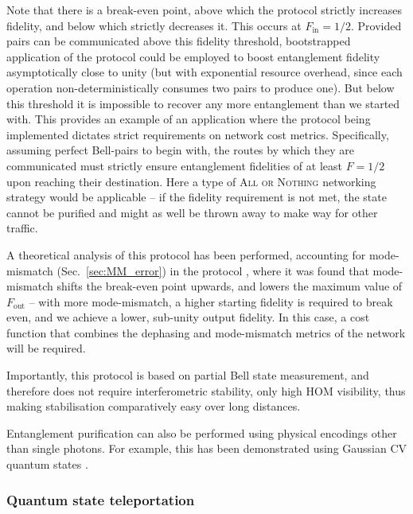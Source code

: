 Note that there is a break-even point, above which the protocol strictly increases fidelity, and below which strictly decreases it. This occurs at \mbox{$F_\text{in}=1/2$}. Provided pairs can be communicated above this fidelity threshold, bootstrapped application of the protocol could be employed to boost entanglement fidelity asymptotically close to unity (but with exponential resource overhead, since each operation non-deterministically consumes two pairs to produce one). But below this threshold it is impossible to recover any more entanglement than we started with. This provides an example of an application where the protocol being implemented dictates strict requirements on network cost metrics. Specifically, assuming perfect Bell-pairs to begin with, the routes by which they are communicated must strictly ensure entanglement fidelities of at least \mbox{$F=1/2$} upon reaching their destination. Here a type of \textsc{All or Nothing} networking strategy would be applicable -- if the fidelity requirement is not met, the state cannot be purified and might as well be thrown away to make way for other traffic.

A theoretical analysis of this protocol has been performed, accounting for mode-mismatch (Sec.~\ref{sec:MM_error}) in the protocol \cite{bib:RohdeOptEntPur06}, where it was found that mode-mismatch shifts the break-even point upwards, and lowers the maximum value of $F_\text{out}$ -- with more mode-mismatch, a higher starting fidelity is required to break even, and we achieve a lower, sub-unity output fidelity. In this case, a cost function that combines the dephasing and mode-mismatch metrics of the network will be required.

Importantly, this protocol is based on partial Bell state measurement, and therefore does not require interferometric stability, only high HOM visibility, thus making stabilisation comparatively easy over long distances.

Entanglement purification can also be performed using physical encodings other than single photons. For example, this has been demonstrated using Gaussian CV quantum states \cite{bib:Duan00}.

%
%

\subsubsection{Quantum state teleportation} \label{sec:teleport} 

